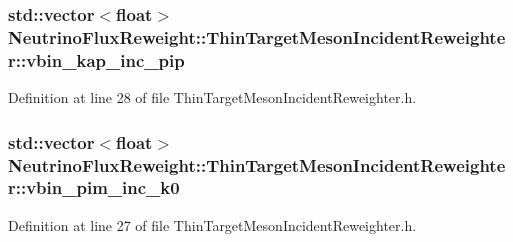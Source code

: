 \hypertarget{class_neutrino_flux_reweight_1_1_thin_target_meson_incident_reweighter_a72f48dfba611a3737f4da6bc4302c05b}{
\subsubsection[{vbin\-\_\-kap\-\_\-inc\-\_\-pip}]{\setlength{\rightskip}{0pt plus 5cm}std\-::vector$<$float$>$ Neutrino\-Flux\-Reweight\-::\-Thin\-Target\-Meson\-Incident\-Reweighter\-::vbin\-\_\-kap\-\_\-inc\-\_\-pip}}\label{class_neutrino_flux_reweight_1_1_thin_target_meson_incident_reweighter_a72f48dfba611a3737f4da6bc4302c05b}


Definition at line 28 of file Thin\-Target\-Meson\-Incident\-Reweighter.\-h.

\hypertarget{class_neutrino_flux_reweight_1_1_thin_target_meson_incident_reweighter_ad96b9c15064515154988b33c1a237743}{
\subsubsection[{vbin\-\_\-pim\-\_\-inc\-\_\-k0}]{\setlength{\rightskip}{0pt plus 5cm}std\-::vector$<$float$>$ Neutrino\-Flux\-Reweight\-::\-Thin\-Target\-Meson\-Incident\-Reweighter\-::vbin\-\_\-pim\-\_\-inc\-\_\-k0}}\label{class_neutrino_flux_reweight_1_1_thin_target_meson_incident_reweighter_ad96b9c15064515154988b33c1a237743}


Definition at line 27 of file Thin\-Target\-Meson\-Incident\-Reweighter.\-h.


